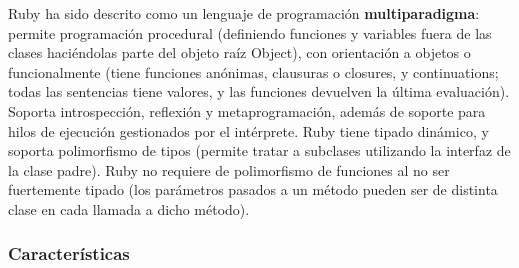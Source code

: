       Ruby ha sido descrito como un lenguaje de programación {\bf multiparadigma}: permite programación procedural (definiendo funciones y variables fuera de las clases haciéndolas parte del objeto raíz Object), con orientación a objetos o funcionalmente (tiene funciones anónimas, clausuras o closures, y continuations; todas las sentencias tiene valores, y las funciones devuelven la última evaluación). Soporta introspección, reflexión y metaprogramación, además de soporte para hilos de ejecución gestionados por el intérprete. Ruby tiene tipado dinámico, y soporta polimorfismo de tipos (permite tratar a subclases utilizando la interfaz de la clase padre). Ruby no requiere de polimorfismo de funciones al no ser fuertemente tipado (los parámetros pasados a un método pueden ser de distinta clase en cada llamada a dicho método).
    
    \subsubsection{Características} %
    \label{ssub:ruby_caracteristicas}
    
